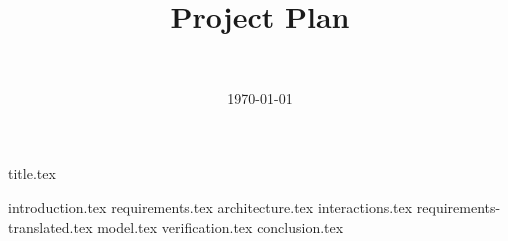 \documentclass[final]{report}
\title{Project Plan}
\author{~}
\date{\today}
\begin{document}

{title.tex}
\newpage
\tableofcontents

\newpage
{}
{introduction.tex} %
{requirements.tex} %
{architecture.tex} %
{interactions.tex} %
{requirements-translated.tex} %
{model.tex} %
{verification.tex} %
{conclusion.tex} %
\newpage
{}

\end{document}
